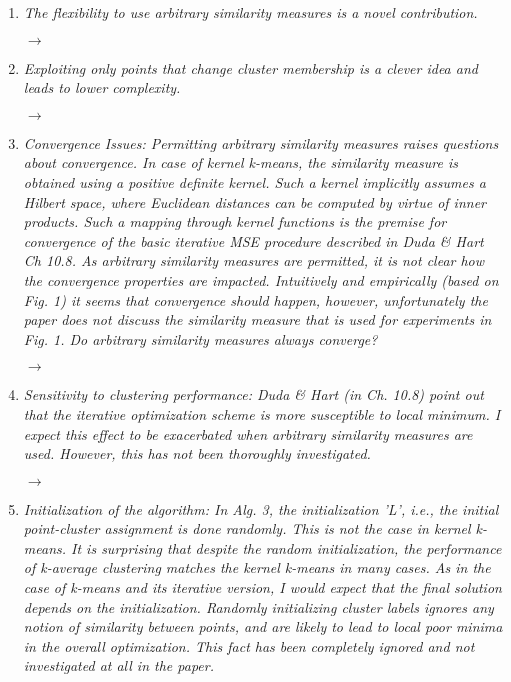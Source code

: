 \documentclass[10pt]{article}
\begin{document}
\begin{enumerate}

\item \emph{The flexibility to use arbitrary similarity measures is a novel contribution.}

$\rightarrow$

\item \emph{Exploiting only points that change cluster membership is a clever idea and leads to lower complexity.}

$\rightarrow$


\item \emph{Convergence Issues: Permitting arbitrary similarity measures raises questions about convergence. In case of kernel k-means, the similarity measure is obtained using a positive definite kernel. Such a kernel implicitly assumes a Hilbert space, where Euclidean distances can be computed by virtue of inner products. Such a mapping through kernel functions is the premise for convergence of the basic iterative MSE procedure described in Duda \& Hart Ch 10.8. As arbitrary similarity measures are permitted, it is not clear how the convergence properties are impacted. Intuitively and empirically (based on Fig. 1) it seems that convergence should happen, however, unfortunately the paper does not discuss the similarity measure that is used for experiments in Fig. 1. Do arbitrary similarity measures always converge?}

$\rightarrow$

\item \emph{Sensitivity to clustering performance:
Duda \& Hart (in Ch. 10.8) point out that the iterative optimization scheme is more susceptible to local minimum. I expect this effect to be exacerbated when arbitrary similarity measures are used. However, this has not been thoroughly investigated.}

$\rightarrow$

\item \emph{Initialization of the algorithm:
In Alg. 3, the initialization 'L', i.e., the initial point-cluster assignment is done randomly. This is not the case in kernel k-means. It is surprising that despite the random initialization, the performance of k-average clustering matches the kernel k-means in many cases. As in the case of k-means and its iterative version, I would expect that the final solution depends on the initialization. Randomly initializing cluster labels ignores any notion of similarity between points, and are likely to lead to local poor minima in the overall optimization. This fact has been completely ignored and not investigated at all in the paper.}


\end{enumerate}
\end{document}
